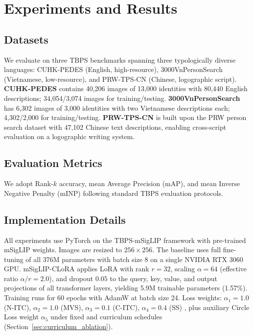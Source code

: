 \documentclass{article}
\begin{document}
\section{Experiments and Results}\label{eexp}

\subsection{Datasets}
We evaluate on three TBPS benchmarks spanning three typologically diverse languages: CUHK-PEDES \cite{Li_2017_CVPR} (English, high-resource), 3000VnPersonSearch \cite{pham2022towards} (Vietnamese, low-resource), and PRW-TPS-CN \cite{wu2023prototype} (Chinese, logographic script). \textbf{CUHK-PEDES} contains 40,206 images of 13,000 identities with 80,440 English descriptions; 34,054/3,074 images for training/testing. \textbf{3000VnPersonSearch} has 6,302 images of 3,000 identities with two Vietnamese descriptions each; 4,302/2,000 for training/testing. \textbf{PRW-TPS-CN} is built upon the PRW person search dataset with 47,102 Chinese text descriptions, enabling cross-script evaluation on a logographic writing system.

\subsection{Evaluation Metrics}
We adopt Rank-$k$ accuracy, mean Average Precision (mAP), and mean Inverse Negative Penalty (mINP) following standard TBPS evaluation protocols.

\subsection{Implementation Details}
All experiments use PyTorch on the TBPS-mSigLIP framework with pre-trained mSigLIP weights. Images are resized to $256 \times 256$. The baseline \cite{tran2025multilingual} uses full fine-tuning of all 376M parameters with batch size 8 on a single NVIDIA RTX 3060 GPU. mSigLIP-CLoRA applies LoRA with rank $r\!=\!32$, scaling $\alpha\!=\!64$ (effective ratio $\alpha/r\!=\!2.0$), and dropout $0.05$ to the query, key, value, and output projections of all transformer layers, yielding 5.9M trainable parameters (1.57\%). Training runs for 60 epochs with AdamW at batch size 24. Loss weights: $\alpha_1\!=\!1.0$ (N-ITC), $\alpha_2\!=\!1.0$ (MVS), $\alpha_3\!=\!0.1$ (C-ITC), $\alpha_4\!=\!0.4$ (SS) \cite{tran2025multilingual}, plus auxiliary Circle Loss weight $\alpha_5$ under fixed and curriculum schedules (Section~\ref{sec:curriculum_ablation}).
\end{document}
